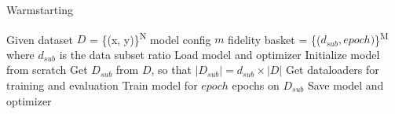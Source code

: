 \documentclass[a4paper,11pt]{article}
\begin{document}
 
\begin{algorithm}
	\caption{Warmstarting} 
	\begin{algorithmic}[1]
            \State Given dataset $D$ = \{(x, y)\}\textsuperscript{N}
            \State model config $m$
            \State fidelity basket = \{($d_{sub}, epoch)$\}\textsuperscript{M} where $d_{sub}$ is the data subset ratio
                    \State Load model and optimizer
                \Else {}
                    \State Initialize model from scratch
                 \EndIf
            \State Get $D_{sub}$ from $D$, so that $| D_{sub} | = d_{sub} \times |D| $
            \State Get dataloaders for training and evaluation
            \State Train model for $epoch$ epochs on $D_{sub}$
            \State Save model and optimizer
		\EndFor
	\end{algorithmic} 
\end{algorithm}
\end{document}
